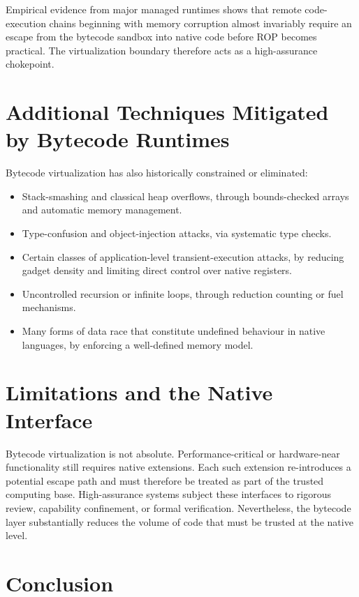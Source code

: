 \documentclass{article}
\begin{document}
Empirical evidence from major managed runtimes shows that remote code-execution chains beginning with memory corruption almost invariably require an escape from the bytecode sandbox into native code before ROP becomes practical. The virtualization boundary therefore acts as a high-assurance chokepoint.

\section{Additional Techniques Mitigated by Bytecode Runtimes}

Bytecode virtualization has also historically constrained or eliminated:

\begin{itemize}[leftmargin=*]
  \item Stack-smashing and classical heap overflows, through bounds-checked arrays and automatic memory management.
  \item Type-confusion and object-injection attacks, via systematic type checks.
  \item Certain classes of application-level transient-execution attacks, by reducing gadget density and limiting direct control over native registers.
  \item Uncontrolled recursion or infinite loops, through reduction counting or fuel mechanisms.
  \item Many forms of data race that constitute undefined behaviour in native languages, by enforcing a well-defined memory model.
\end{itemize}

\section{Limitations and the Native Interface}

Bytecode virtualization is not absolute. Performance-critical or hardware-near functionality still requires native extensions. Each such extension re-introduces a potential escape path and must therefore be treated as part of the trusted computing base. High-assurance systems subject these interfaces to rigorous review, capability confinement, or formal verification. Nevertheless, the bytecode layer substantially reduces the volume of code that must be trusted at the native level.

\section{Conclusion}
\end{document}
